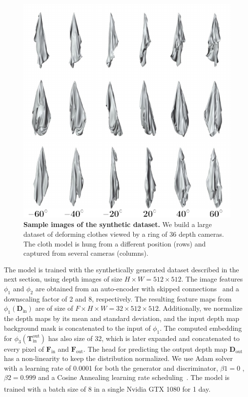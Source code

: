 \begin{figure}
    \centering
    \includegraphics[width=\linewidth]{main/chapter04/data/ipalm_cvpr_grid_dataset_synth.pdf}
    \caption{\small{{\bf Sample images of the synthetic dataset.} We build a large dataset of deforming clothes viewed by a ring of 36 depth cameras. The cloth model is hung from a different position (rows) and captured from several cameras (columns).   
    }}
    \label{fig_setup_cameras}
\end{figure}

The model is trained with the synthetically generated dataset described in the next section, using depth images of size $H \times W = 512 \times 512$. The image features $\phi_1$ and $\phi_2$ are obtained from an auto-encoder with skipped connections~\cite{pix2pix2017} and a downscaling factor of 2 and 8, respectively. The resulting feature maps from $\phi_1(\mathbf{D}_{\textrm{in}})$ are of size of $F\times H \times W = 32 \times 512 \times 512$. Additionally, we normalize the depth maps by its mean and standard deviation, and the input depth map background mask is concatenated to the input of $\phi_1$. The computed embedding for $\phi_3(\mathbf{T}_{\textrm{in}}^{\textrm{out}})$ has also size of 32, which is later expanded and concatenated to every pixel of $\mathbf{F}_{\textrm{in}}$ and $\mathbf{F}_{\textrm{out}}$. The head for predicting the output depth map $\mathbf{D}_{\textrm{out}}$ has a non-linearity  to keep the distribution normalized. We use Adam solver~\cite{kingma2017adam} with a learning rate of 0.0001 for both the generator and discriminator, $\beta1 = 0$ , $\beta2 = 0.999$ and a Cosine Annealing learning rate scheduling~\cite{LoshchilovH16a}.  The model is trained with a batch size of 8 in a single Nvidia\textsuperscript{\textregistered} GTX 1080 for 1 day.

